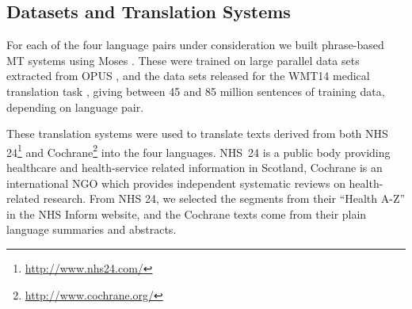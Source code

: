 \documentclass[11pt,letterpaper]{article}
\newcommand{\oa}[1]{}
\newcommand{\bh}[1]{}
\def\parcite#1{\cite{#1}}
\begin{document}




\subsection{Datasets and Translation Systems}

For each of the four language pairs under consideration  we built phrase-based MT systems
using Moses \parcite{Koehn:2007}.  These were trained on large parallel data sets extracted from
OPUS \parcite{tiedemann:2009}, and
the data sets released for the WMT14 medical translation task \parcite{bojar-EtAl:2014:W14-33}, 
giving between 
45 and 85 million sentences of training data, depending on language pair.

These translation systems were used to translate texts derived from both NHS
24\footnote{\url{http://www.nhs24.com/}} and
Cochrane\footnote{\url{http://www.cochrane.org/}} into the four languages.
NHS~24 is a public body providing healthcare and health-service
related information in Scotland, Cochrane is an international NGO
which 
provides independent systematic reviews on health-related research. From NHS 24, we selected the segments from their
``Health A-Z'' in the NHS Inform website, and the Cochrane texts come from their plain language summaries
and abstracts.

\end{document}
